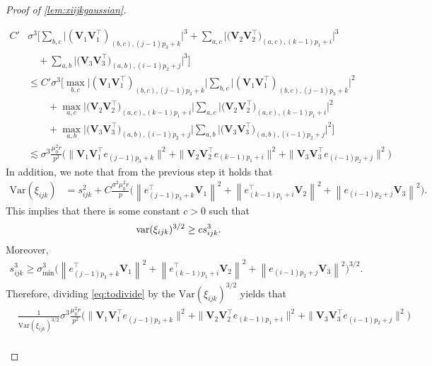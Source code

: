 \documentclass[10pt]{article}
\newcommand{\0}{{\mathbf{0}}}
\newcommand{\1}{{\mathbf{1}}}
\newcommand{\var}{{\rm var}}
\renewcommand{\t}{^{\top}}
\begin{document}
\begin{proof}[Proof of \cref{lem:xiijkgaussian}]
\begin{itemize}
\begin{align}
    C' &\sigma^3 \Bigg[ \sum_{b,c} \big| (\mathbf{V}_1 \mathbf{V}_1\t)_{(b,c),(j-1)p_3 + k} \big|^3 + \sum_{a,c} \big|\big(\mathbf{V}_2 \mathbf{V}_2\t \big)_{(a,c),(k-1)p_1 + i}\big|^3 \nonumber \\
    &\quad + \sum_{a,b} \big|\big( \mathbf{V}_3 \mathbf{V}_3\t \big)_{(a,b),(i-1)p_2+j} \big|^3 \Bigg] \nonumber \\
    &\leq C' \sigma^3 \bigg[ \max_{b,c} \big| (\mathbf{V}_1 \mathbf{V}_1\t)_{(b,c),(j-1)p_3 + k} \big| \sum_{b,c} \big| (\mathbf{V}_1 \mathbf{V}_1\t)_{(b,c),(j-1)p_3 + k} \big|^2 \nonumber \\
    &\qquad + \max_{a,c}  \big|\big(\mathbf{V}_2 \mathbf{V}_2\t \big)_{(a,c),(k-1)p_1 + i}\big| \sum_{a,c} \big|\big(\mathbf{V}_2 \mathbf{V}_2\t \big)_{(a,c),(k-1)p_1 + i}\big|^2 \nonumber \\
    &\qquad + \max_{a,b} \big|\big( \mathbf{V}_3 \mathbf{V}_3\t \big)_{(a,b),(i-1)p_2+j} \big| \sum_{a,b} \big|\big( \mathbf{V}_3 \mathbf{V}_3\t \big)_{(a,b),(i-1)p_2+j} \big|^2 \Bigg]  \nonumber \\
    &\lesssim \sigma^3 \frac{\mu_0^2 r}{p^2} \bigg( \| \mathbf{V}_1 \mathbf{V}_1\t e_{(j-1)p_3 + k} \|^2 + \| \mathbf{V}_2 \mathbf{V}_2\t e_{(k-1)p_1 + i} \|^2 + \| \mathbf{V}_3 \mathbf{V}_3\t e_{(i-1)p_2 + j} \|^2 \bigg) \label{eq:todivide}
\end{align}
In addition, we note that from the previous step it holds that
\begin{align*}
    \mathrm{Var}(\xi_{ijk}) &= s_{ijk}^2 + C \frac{\sigma^2 \mu_0^2 r}{p} \bigg( \left\|e_{(j-1) p_{3}+k}^{\top} \mathbf{V}_{1}\right\|^{2}+\left\|e_{(k-1) p_{1}+i}^{\top} \mathbf{V}_{2}\right\|^{2}+\left\|e_{(i-1) p_{2}+j} \mathbf{V}_{3}\right\|^{2} \bigg).
\end{align*}
This implies that there is some constant $c > 0$ such that
\begin{align*}
    \mathrm{\var}(\xi_{ijk})^{3/2} &\geq c s_{ijk}^{3}.
\end{align*}
Moreover,
\begin{align*}
    s_{ijk}^3 \geq \sigma_{\min}^3 \bigg( \left\|e_{(j-1) p_{3}+k}^{\top} \mathbf{V}_{1}\right\|^{2}+\left\|e_{(k-1) p_{1}+i}^{\top} \mathbf{V}_{2}\right\|^{2}+\left\|e_{(i-1) p_{2}+j} \mathbf{V}_{3}\right\|^{2} \bigg)^{3/2}.
\end{align*}
Therefore, dividing \eqref{eq:todivide} by the $\mathrm{Var}(\xi_{ijk})^{3/2}$ yields that
\begin{align*}
    &\frac{1}{\mathrm{Var}(\xi_{ijk})^{3/2}} \sigma^3 \frac{\mu_0^2 r}{p^2} \bigg( \| \mathbf{V}_1 \mathbf{V}_1\t e_{(j-1)p_3 + k} \|^2 + \| \mathbf{V}_2 \mathbf{V}_2\t e_{(k-1)p_1 + i} \|^2 + \| \mathbf{V}_3 \mathbf{V}_3\t e_{(i-1)p_2 + j} \|^2 \bigg) \\

\end{align*}
\end{itemize}
\end{proof}
\end{document}
